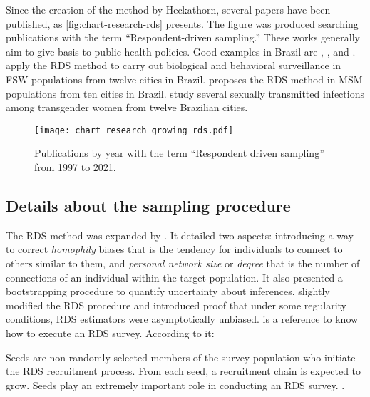 Since the creation of the method by Heckathorn, several papers have been
published, as \autoref{fig:chart-research-rds} presents. The figure was produced searching
publications with the term ``Respondent-driven sampling.'' These works generally
aim to give basis to public health policies. Good examples in Brazil are
\cite{damacena2019application}, \cite{mota2012respondent}, and
\cite{bastos2018hiv}. \textcite{damacena2019application} apply the RDS method
to carry out biological and behavioral surveillance in FSW populations from twelve cities
in Brazil. \textcite{mota2012respondent} proposes the RDS method in MSM populations from ten cities in
Brazil. \textcite{bastos2018hiv} study several sexually transmitted infections among
transgender women from twelve Brazilian cities.  

\begin{figure}
  \centering  
  \caption{\label{fig:chart-research-rds}Publications by year with the term
  ``Respondent driven sampling'' from 1997 to 2021.}
  \texttt{[image: chart\_research\_growing\_rds.pdf]}
\end{figure}

\subsection{Details about the sampling procedure}
\label{sec:sampling-procedure}

The RDS method was expanded by \textcite{heckathorn2002}. It detailed two aspects: 
introducing a way to correct {\em homophily} biases that is the tendency for
individuals to connect to others similar to them, and {\em personal network size} or
{\em degree} that is the number of connections of an individual within the
target population. It also presented a bootstrapping procedure to quantify
uncertainty about inferences. \textcite{salganik2004sampling} slightly modified the
RDS procedure and introduced proof that under some regularity conditions, RDS
estimators were asymptotically unbiased. \textcite{world2013introduction}
is a reference to know how to execute an RDS survey. According to it: 

\begin{citacao}
  Seeds are non-randomly selected members of the survey population who initiate the RDS
  recruitment process. From each seed, a recruitment chain is expected to grow. Seeds play
  an extremely important role in conducting an RDS survey. \cite[p. 70]{world2013introduction}.
\end{citacao}

